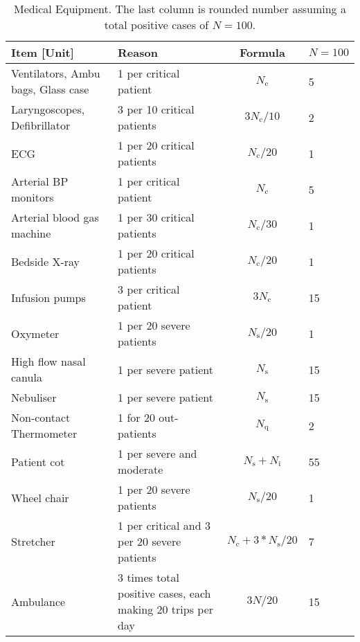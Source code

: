 \documentclass{article}
\newcommand{\nc}{\ensuremath{N_{\mathrm{c}}}}
\newcommand{\ns}{\ensuremath{N_{\mathrm{s}}}}
\newcommand{\nin}{\ensuremath{N_{\mathrm{i}}}}
\newcommand{\nq}{\ensuremath{N_{\mathrm{q}}}}
\begin{document}
\begin{landscape}
\begin{table}
  \caption{Medical Equipment. The last column is
    rounded number assuming a total positive cases of $N=100$.}
  \begin{tabularx}{\linewidth}{XXcl}
    \toprule
    Item [Unit] & Reason & Formula & $N=100$\\
    \midrule
    Ventilators, Ambu bags, Glass case & 1 per critical patient&
    $\nc$ & 5 \\
    Laryngoscopes, Defibrillator & 3 per 10 critical patients &
    $3 \nc/10$ & 2 \\
    ECG & 1 per 20 critical patients& $\nc/20$ & 1\\
    Arterial BP monitors & 1 per critical patient &
    $\nc$ & 5 \\
    Arterial blood gas machine & 1 per 30 critical patients &
    $\nc/30$ & 1 \\
    Bedside X-ray & 1 per 20 critical patients & $\nc/20$ & 1\\
    Infusion pumps & 3 per critical patient & $3 \nc$ & 15 \\
    Oxymeter &  1 per 20 severe patients & $\ns/20$ & 1\\
    High flow nasal canula & 1 per severe patient & $\ns$ & 15\\
    Nebuliser & 1 per severe patient & $\ns$ & 15\\
    Non-contact Thermometer & 1 for 20 out-patients & $\nq$ & 2\\
    Patient cot & 1 per severe and moderate & $\ns+\nin$ & 55 \\
    Wheel chair & 1 per 20 severe patients & $\ns/20$ & 1\\
    Stretcher & 1 per critical and 3 per 20 severe patients &
    $\nc + 3*\ns/20$ & 7\\
    Ambulance &  3 times total positive cases, each making 20 trips
    per day & $3 N / 20$ & 15\\
\bottomrule
\end{tabularx}
\end{table}
\end{landscape}
\end{document}
